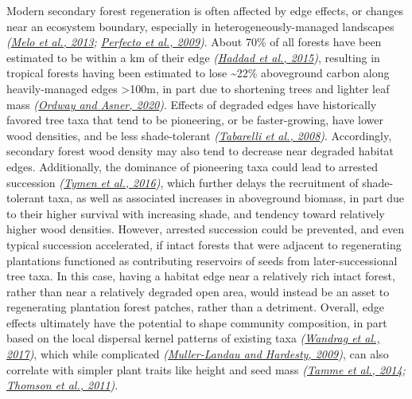 \documentclass[
  12pt,
]{article}
\begin{document}
Modern secondary forest regeneration is often affected by edge effects, or changes near an ecosystem boundary, especially in heterogeneously-managed landscapes \emph{(\protect\hyperlink{ref-melo13}{Melo et al., 2013}; \protect\hyperlink{ref-perfecto09}{Perfecto et al., 2009})}.
About 70\% of all forests have been estimated to be within a km of their edge \emph{(\protect\hyperlink{ref-haddad15}{Haddad et al., 2015})}, resulting in tropical forests having been estimated to lose \textasciitilde22\% aboveground carbon along heavily-managed edges \textgreater100m, in part due to shortening trees and lighter leaf mass \emph{(\protect\hyperlink{ref-ordway20}{Ordway and Asner, 2020})}.
Effects of degraded edges have historically favored tree taxa that tend to be pioneering, or be faster-growing, have lower wood densities, and be less shade-tolerant \emph{(\protect\hyperlink{ref-tabarelli08}{Tabarelli et al., 2008})}.
Accordingly, secondary forest wood density may also tend to decrease near degraded habitat edges.
Additionally, the dominance of pioneering taxa could lead to arrested succession \emph{(\protect\hyperlink{ref-tymen16}{Tymen et al., 2016})}, which further delays the recruitment of shade-tolerant taxa, as well as associated increases in aboveground biomass, in part due to their higher survival with increasing shade, and tendency toward relatively higher wood densities.
However, arrested succession could be prevented, and even typical succession accelerated, if intact forests that were adjacent to regenerating plantations functioned as contributing reservoirs of seeds from later-successional tree taxa.
In this case, having a habitat edge near a relatively rich intact forest, rather than near a relatively degraded open area, would instead be an asset to regenerating plantation forest patches, rather than a detriment.
Overall, edge effects ultimately have the potential to shape community composition, in part based on the local dispersal kernel patterns of existing taxa \emph{(\protect\hyperlink{ref-wandrag17}{Wandrag et al., 2017})}, which while complicated \emph{(\protect\hyperlink{ref-muller-landau09}{Muller-Landau and Hardesty, 2009})}, can also correlate with simpler plant traits like height and seed mass \emph{(\protect\hyperlink{ref-tamme14}{Tamme et al., 2014}; \protect\hyperlink{ref-thomson11}{Thomson et al., 2011})}.
\end{document}
